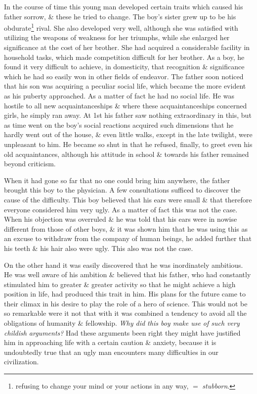 \documentclass{article}
\begin{document}
In the course of time this young man developed certain traits which caused his father sorrow, \& these he tried to change. The boy's sister grew up to be his obdurate\footnote{refusing to change your mind or your actions in any way, $=$ {\it stubborn}.} rival. She also developed very well, although she was satisfied with utilizing the weapons of weakness for her triumphs, while she enlarged her significance at the cost of her brother. She had acquired a considerable facility in household tasks, which made competition difficult for her brother. As a boy, he found it very difficult to achieve, in domesticity, that recognition \& significance which he had so easily won in other fields of endeavor. The father soon noticed that his son was acquiring a peculiar social life, which became the more evident as his puberty approached. As a matter of fact he had no social life. He was hostile to all new acquaintanceships \& where these acquaintanceships concerned girls, he simply ran away. At 1st his father saw nothing extraordinary in this, but as time went on the boy's social reactions acquired such dimensions that he hardly went out of the house, \& even little walks, except in the late twilight, were unpleasant to him. He became so shut in that he refused, finally, to greet even his old acquaintances, although his attitude in school \& towards his father remained beyond criticism.

When it had gone so far that no one could bring him anywhere, the father brought this boy to the physician. A few consultations sufficed to discover the cause of the difficulty. This boy believed that his ears were small \& that therefore everyone considered him very ugly. As a matter of fact this was not the case. When his objection was overruled \& he was told that his ears were in nowise different from those of other boys, \& it was shown him that he was using this as an excuse to withdraw from the company of human beings, he added further that his teeth \& his hair also were ugly. This also was not the case.

On the other hand it was easily discovered that he was inordinately ambitious. He was well aware of his ambition \& believed that his father, who had constantly stimulated him to greater \& greater activity so that he might achieve a high position in life, had produced this trait in him. His plans for the future came to their climax in his desire to play the role of a hero of science. This would not be so remarkable were it not that with it was combined a tendency to avoid all the obligations of humanity \& fellowship. {\it Why did this boy make use of such very childish arguments?} Had these arguments been right they might have justified him in approaching life with a certain caution \& anxiety, because it is undoubtedly true that an ugly man encounters many difficulties in our civilization.
\end{document}
